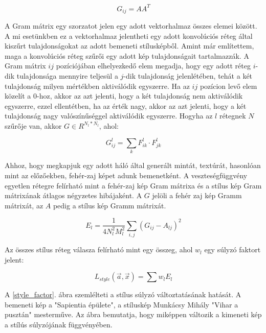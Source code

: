 \documentclass[12pt, a4paper, oneside]{book}
\theoremstyle{tetel}
\begin{document}
\begin{equation}
G_{ij} = A A^T
\end{equation}

A Gram mátrix egy szorzatot jelen egy adott vektorhalmaz összes elemei között. A mi esetünkben ez a vektorhalmaz jelentheti egy adott konvolúciós réteg által kiszűrt tulajdonságokat az adott bemeneti stílusképből. Amint már említettem, maga a konvolúciós réteg szűrői egy adott kép tulajdonságait tartalmazzák. A Gram mátrix \(ij\) pozíciójában elhelyezkedő elem megadja, hogy egy adott réteg \(i\)-dik tulajdonsága mennyire teljesül a \(j\)-dik tulajdonság jelenlétében, tehát a két tulajdonság milyen mértékben aktiválódik egyszerre. Ha az \(ij\) pozícion levő elem közelít a \(0\)-hoz, akkor az azt jelenti, hogy a két tulajdonság nem aktiválódik egyszerre, ezzel ellentétben, ha az érték nagy, akkor az azt jelenti, hogy a két tulajdonság nagy valószínűséggel aktiválódik egyszerre.
\newline
\indent
Hogyha az \(l\) rétegnek \(N\) szűrője van, akkor \(G \in R^{N_l*N_l}\), ahol:

\begin{equation}
G^l_{ij} = \sum_{k} F^l_{ik} \cdot F^l_{jk}
\end{equation}

Ahhoz, hogy megkapjuk egy adott háló által generált mintát, textúrát, hasonlóan mint az előzőekben, fehér-zaj képet adunk bemenetként. A veszteségfüggvény egyetlen rétegre felírható mint a fehér-zaj kép Gram mátrixa és a stílus kép Gram mátrixának átlagos négyzetes hibájaként. A \(G\) jelöli a fehér zaj kép Gramm mátrixát, az \(A\) pedig a stílus kép Gramm mátrixát.

\begin{equation}
E_l = \frac{1}{4N^2_l M^2_l} \sum_{i,j} (G_{ij} - A_{lj})^2
\end{equation}

Az összes stílus réteg válasza felírható mint egy összeg, ahol \(w_l\) egy súlyzó faktort jelent:

\begin{equation}
L_{style}(\vec{a}, \vec{x}) = \sum w_lE_l
\end{equation}

A \ref{style_factor}. ábra szemlélteti a stílus súlyzó változtatásának hatását. A bemeneti kép a "Sapientia épülete", a stíluskép Munkácsy Mihály "Vihar a pusztán" mesterműve. Az ábra bemutatja, hogy miképpen változik a kimeneti kép a stílús súlyzójának függvényében.
\end{document}

